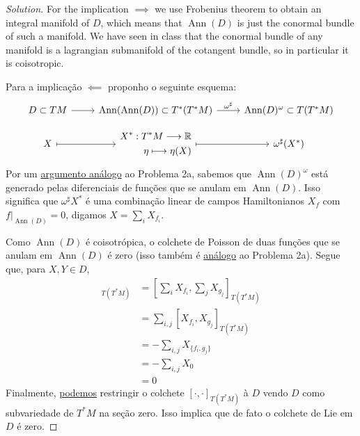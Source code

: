 \begin{proof}[Solution]\leavevmode
	For the implication $\implies$ we use Frobenius theorem to obtain an integral manifold of $D$, which means that $\operatorname{Ann}(D)$ is just the conormal bundle of such a manifold. We have seen in class that the conormal bundle of any manifold is a lagrangian submanifold of the cotangent bundle, so in particular it is coisotropic.

	Para a implicação $\impliedby$ proponho o seguinte esquema:
	\[\begin{tikzcd}[row sep= small]
		D\subset TM\arrow[r]&\operatorname{Ann}(\operatorname{Ann}(D)) \subset T^* (T^*M)\arrow[r,"\omega ^\sharp"]& \operatorname{Ann}(D)^\omega\subset T(T^* M)\\
		X\arrow[r, maps to]&
			\begin{aligned}
				X^*: T^*M \longrightarrow \mathbb{R} \\
				\eta \longmapsto \eta(X)
			\end{aligned}
			\arrow[r, maps to]& \omega ^\sharp(X^*)
	\end{tikzcd}\]
	Por um  \href{https://math.stackexchange.com/questions/4578202/equivalent-condition-for-coisotropic-submanifold}{argumento análogo} ao Problema 2a, sabemos que $\operatorname{Ann}(D)^\omega$ está generado pelas diferenciais de funções  que se anulam em $\operatorname{Ann}(D)$. Isso significa que $\omega^\sharp X^*$ é uma combinação linear de campos Hamiltonianos $X_f$ com  $f|_{\operatorname{Ann}(D)}=0$, digamos $X=\sum_{i}X_{f_i}$.

	Como $\operatorname{Ann}(D)$ é coisotrópica, o colchete de Poisson de duas funções que se anulam em $\operatorname{Ann}(D)$ é zero (isso também é  \href{https://math.stackexchange.com/questions/4578202/equivalent-condition-for-coisotropic-submanifold}{análogo} ao Problema 2a). Segue que, para $X,Y\in D$,
	\begin{align*}
		[\omega^\sharp X^*,\omega^\sharp Y^*]_{T(T^*M)}&=\left[ \sum_{i}X_{f_i},\sum_{j}X_{g_j} \right]_{T(T^*M)}\\
						     &=\sum_{i,j}[X_{f_i},X_{g_j}]_{T(T^*M)}\\
						     &=-\sum_{i,j}X_{\{f_{i},g_{j}\}}\\
						     &=-\sum_{i,j}X_{0}\\
						     &=0
	\end{align*}
Finalmente, \href{https://mathoverflow.net/questions/140578/poisson-structure-on-the-cotangent-bundle}{podemos} restringir o colchete $[\cdot,\cdot ]_{T(T^*M)}$ à $D$ vendo  $D$ como subvariedade de $T^*M$ na seção zero. Isso implica que de fato o colchete de Lie em $D$ é zero.

\end{proof}

